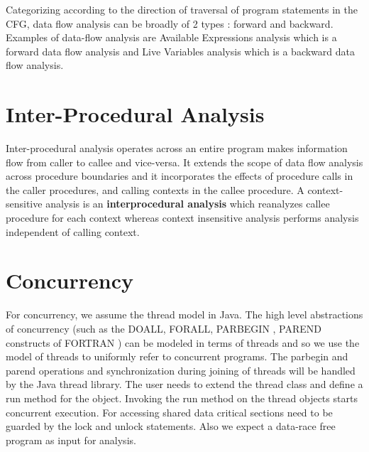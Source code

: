 Categorizing according to the direction of traversal of program statements in the CFG, data flow analysis can be broadly of 2 types : forward and backward. Examples of
data-flow analysis are Available Expressions analysis which is a forward data flow analysis
and Live Variables analysis which is a backward data flow analysis. \\

\section{Inter-Procedural Analysis}

Inter-procedural analysis operates across an entire program makes information flow from caller to callee and vice-versa. It extends the scope of data flow analysis across procedure boundaries and it incorporates the effects of procedure calls in the caller procedures, and calling contexts in the callee procedure. A context-sensitive analysis is an \textbf{interprocedural analysis} which reanalyzes callee procedure for each context whereas context insensitive analysis performs analysis independent of calling context.





\section{Concurrency}

For concurrency, we assume the thread model in Java. The high level abstractions of concurrency (such as the DOALL, FORALL, PARBEGIN , PAREND constructs of FORTRAN ) can be modeled in terms of threads and so we use the model of threads to uniformly refer to concurrent programs. The parbegin and parend operations and synchronization during joining of threads will be handled by the Java thread library. The user needs to extend the thread class and define a run method for the object. Invoking the run method on the thread objects starts concurrent execution. For accessing shared data critical sections need to be guarded by the lock and unlock statements. Also we expect a data-race free program as input for analysis.


%

